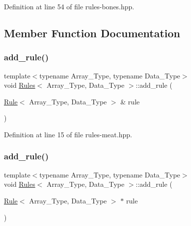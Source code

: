 Definition at line 54 of file rules-\/bones.\+hpp.



\subsection{Member Function Documentation}
\mbox{\label{class_rules_a60583152fddcb11178dcf3d02a924d7c}} 
\subsubsection{\texorpdfstring{add\+\_\+rule()}{add\_rule()}\hspace{0.1cm}{\footnotesize\ttfamily [1/3]}}
{\footnotesize\ttfamily template$<$typename Array\+\_\+\+Type, typename Data\+\_\+\+Type$>$ \\
void \hyperlink{class_rules}{Rules}$<$ Array\+\_\+\+Type, Data\+\_\+\+Type $>$\+::add\+\_\+rule (\begin{DoxyParamCaption}\item[{\hyperlink{class_rule}{Rule}$<$ Array\+\_\+\+Type, Data\+\_\+\+Type $>$ \&}]{rule }\end{DoxyParamCaption})\hspace{0.3cm}{\ttfamily [inline]}}



Definition at line 15 of file rules-\/meat.\+hpp.

\mbox{\label{class_rules_abd60b1d381ad0c8a772e4d81264bbe0a}} 
\subsubsection{\texorpdfstring{add\+\_\+rule()}{add\_rule()}\hspace{0.1cm}{\footnotesize\ttfamily [2/3]}}
{\footnotesize\ttfamily template$<$typename Array\+\_\+\+Type, typename Data\+\_\+\+Type$>$ \\
void \hyperlink{class_rules}{Rules}$<$ Array\+\_\+\+Type, Data\+\_\+\+Type $>$\+::add\+\_\+rule (\begin{DoxyParamCaption}\item[{\hyperlink{class_rule}{Rule}$<$ Array\+\_\+\+Type, Data\+\_\+\+Type $>$ $\ast$}]{rule }\end{DoxyParamCaption})\hspace{0.3cm}{\ttfamily [inline]}}



